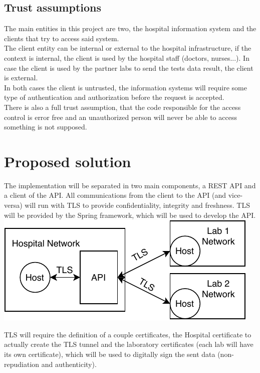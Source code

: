 \subsection{Trust assumptions}

The main entities in this project are two, the hospital information system and the clients that try to access said system. \\

The client entity can be internal or external to the hospital infrastructure, if the context is internal, the client is used by the hospital staff (doctors, nurses...). In case the client is used by the partner labs to send the tests data result, the client is external. \\

In both cases the client is untrusted, the information systems will require some type of authentication and authorization before the request is accepted. \\ 

There is also a full trust assumption, that the code responsible for the access control is error free and an unauthorized person will never be able to access something is not supposed. \\

\section{Proposed solution}

The implementation will be separated in two main components, a REST API and a client of the API.
All communications from the client to the API (and vice-versa) will run with TLS to provide confidentiality, integrity and freshness. TLS will be provided by the Spring framework, which will be used to develop the API. \\

	\includegraphics[width=.4\textwidth]{figs/network_layout.pdf}
	
TLS will require the definition of a couple certificates, the Hospital certificate to actually create the TLS tunnel and the laboratory certificates (each lab will have its own certificate), which will be used to digitally sign the sent data (non-repudiation and authenticity). \\ 

